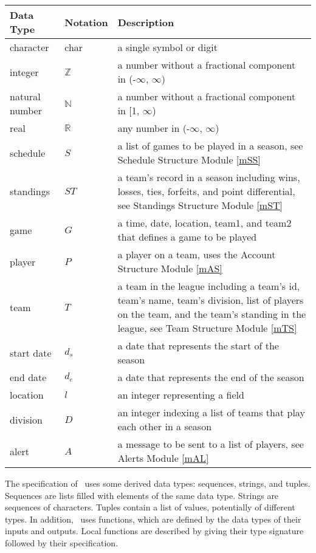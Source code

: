 \documentclass[12pt, titlepage]{article}
\begin{document}
\begin{center}
\renewcommand{\arraystretch}{1.2}
\noindent 
\begin{tabular}{l l p{7.5cm}} 
\toprule 
\textbf{Data Type} & \textbf{Notation} & \textbf{Description}\\ 
\midrule
character & char & a single symbol or digit\\
integer & $\mathbb{Z}$ & a number without a fractional component in (-$\infty$, $\infty$) \\
natural number & $\mathbb{N}$ & a number without a fractional component in [1, $\infty$) \\
real & $\mathbb{R}$ & any number in (-$\infty$, $\infty$)\\
schedule & $S$ & a list of games to be played in a season, see Schedule
Structure Module \ref{mSS}\\
standings & $ST$ & a team's record in a season including wins, losses,
ties, forfeits, and point differential, see Standings
Structure Module \ref{mST}\\
game & $G$ & a time, date, location, team1, and team2 that defines a game to
be played\\
player & $P$ & a player on a team, uses the Account Structure Module
\ref{mAS}\\
team & $T$ & a team in the league including a team's id, team's name, team's division,
list of players on the team, and the team's standing in the league,
see Team Structure Module \ref{mTS}\\
start date & $d_s$ & a date that represents the start of the season\\
end date & $d_e$ & a date that represents the end of the season\\
location & $l$ & an integer representing a field\\
division & $D$ & an integer indexing a list of teams that play each other in a
season\\
alert & $A$ & a message to be sent to a list of players, see Alerts Module
\ref{mAL}\\

\bottomrule
\end{tabular} 
\end{center}

\noindent
The specification of \progname \ uses some derived data types: sequences, strings, and
tuples. Sequences are lists filled with elements of the same data type. Strings
are sequences of characters. Tuples contain a list of values, potentially of
different types. In addition, \progname \ uses functions, which
are defined by the data types of their inputs and outputs. Local functions are
described by giving their type signature followed by their specification.
\end{document}
